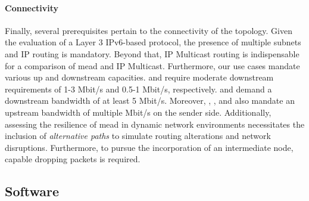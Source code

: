 \paragraph{Connectivity} %
\label{par:Connectivity}
Finally, several prerequisites pertain to the connectivity of the topology.
Given the evaluation of a Layer 3 IPv6-based protocol, the presence of multiple
    subnets and IP routing is mandatory.
Beyond that, IP Multicast routing is indispensable for a comparison of \gls{mead}
    and IP Multicast.
Furthermore, our use cases mandate various up and downstream capacities.
\uciii{} and \uciv{} require moderate downstream requirements of 1-3 Mbit/s and 0.5-1
    Mbit/s, respectively.
\uci{} and \ucii{} demand a downstream bandwidth of at least 5 Mbit/s.
Moreover, \uci{}, \ucii{}, and \uciii{} also mandate an upstream bandwidth of multiple
    Mbit/s on the sender side.
Additionally, assessing the resilience of \gls{mead} in dynamic network
    environments necessitates the inclusion of \textit{alternative paths} to
    simulate routing alterations and network disruptions.
Furthermore, to pursue \textit{\rqi{}} the incorporation of an intermediate node,
    capable dropping packets is required.



\subsection{Software} %
\label{sub:Software}
\label{sub:Requirements}


